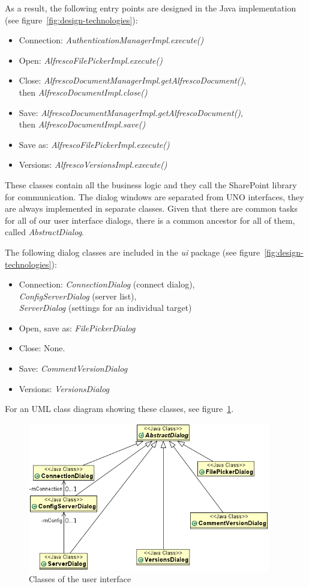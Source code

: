 As a result, the following entry points are designed in the Java
implementation (see figure~\ref{fig:design-technologies}):

\begin{itemize}
\item Connection: \emph{AuthenticationManagerImpl.execute()}
\item Open: \emph{AlfrescoFilePickerImpl.execute()}
\item Close: \emph{AlfrescoDocumentManagerImpl.getAlfrescoDocument()}, \\ then \emph{AlfrescoDocumentImpl.close()}
\item Save: \emph{AlfrescoDocumentManagerImpl.getAlfrescoDocument()}, \\ then \emph{AlfrescoDocumentImpl.save()}
\item Save as: \emph{AlfrescoFilePickerImpl.execute()}
\item Versions: \emph{AlfrescoVersionsImpl.execute()}
\end{itemize}

These classes contain all the business logic and they call the SharePoint
library for communication. The dialog windows are separated from UNO
interfaces, they are always implemented in separate classes. Given that there
are common tasks for all of our user interface dialogs, there is a common
ancestor for all of them, called \emph{AbstractDialog}.

The following dialog classes are included in the \emph{ui} package (see figure~\ref{fig:design-technologies}):

\begin{itemize}
\item Connection: \emph{ConnectionDialog} (connect dialog), \\
\emph{ConfigServerDialog} (server list), \\ \emph{ServerDialog} (settings for an
individual target)
\item Open, save as: \emph{FilePickerDialog}
\item Close: None.
\item Save: \emph{CommentVersionDialog}
\item Versions: \emph{VersionsDialog}
\end{itemize}

For an UML class diagram showing these classes, see figure~\ref{fig:design-spui}.

\begin{figure}[p]
\centering
\includegraphics[width=400px,keepaspectratio]{design-spui.png}
\caption{Classes of the user interface}
\label{fig:design-spui}
\end{figure}

